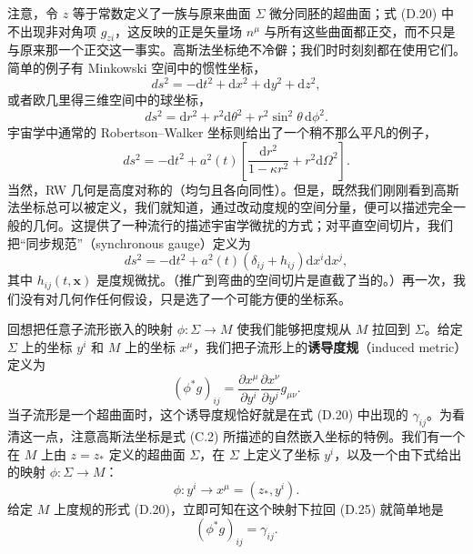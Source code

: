 注意，令 $z$ 等于常数定义了一族与原来曲面 $\Sigma$ 微分同胚的超曲面；式 (D.20) 中不出现非对角项 $g_{zi}$，这反映的正是矢量场 $n^\mu$ 与所有这些曲面都正交，而不只是与原来那一个正交这一事实。高斯法坐标绝不冷僻；我们时时刻刻都在使用它们。简单的例子有 Minkowski 空间中的惯性坐标，
\begin{equation*}
ds^2 = -\mathrm{d}t^2 + \mathrm{d}x^2 + \mathrm{d}y^2 + \mathrm{d}z^2,
\tag{D.21}
\end{equation*}
或者欧几里得三维空间中的球坐标，
\begin{equation*}
ds^2 = \mathrm{d}r^2 + r^2 \mathrm{d}\theta^2 + r^2 \sin^2 \theta \, \mathrm{d}\phi^2.
\tag{D.22}
\end{equation*}
宇宙学中通常的 Robertson--Walker 坐标则给出了一个稍不那么平凡的例子，
\begin{equation*}
ds^2 = -\mathrm{d}t^2 + a^2(t) \left[ \frac{\mathrm{d}r^2}{1 - \kappa r^2} + r^2 \mathrm{d}\Omega^2 \right].
\tag{D.23}
\end{equation*}
当然，RW 几何是高度对称的（均匀且各向同性）。但是，既然我们刚刚看到高斯法坐标总可以被定义，我们就知道，通过改动度规的空间分量，便可以描述完全一般的几何。这提供了一种流行的描述宇宙学微扰的方式；对平直空间切片，我们把“同步规范”（synchronous gauge）定义为
\begin{equation*}
ds^2 = -\mathrm{d}t^2 + a^2(t) (\delta_{ij} + h_{ij}) \mathrm{d}x^i \mathrm{d}x^j,
\tag{D.24}
\end{equation*}
其中 $h_{ij}(t, \mathbf{x})$ 是度规微扰。（推广到弯曲的空间切片是直截了当的。）再一次，我们没有对几何作任何假设，只是选了一个可能方便的坐标系。

回想把任意子流形嵌入的映射 $\phi : \Sigma \to M$ 使我们能够把度规从 $M$ 拉回到 $\Sigma$。给定 $\Sigma$ 上的坐标 $y^i$ 和 $M$ 上的坐标 $x^\mu$，我们把子流形上的\textbf{诱导度规}（induced metric）定义为
\begin{equation*}
(\phi^* g)_{ij} = \frac{\partial x^\mu}{\partial y^i} \frac{\partial x^\nu}{\partial y^j} g_{\mu\nu}.
\tag{D.25}
\end{equation*}
当子流形是一个超曲面时，这个诱导度规恰好就是在式 (D.20) 中出现的 $\gamma_{ij}$。为看清这一点，注意高斯法坐标是式 (C.2) 所描述的自然嵌入坐标的特例。我们有一个在 $M$ 上由 $z = z_*$ 定义的超曲面 $\Sigma$，在 $\Sigma$ 上定义了坐标 $y^i$，以及一个由下式给出的映射 $\phi : \Sigma \to M$：
\begin{equation*}
\phi : y^i \to x^\mu = (z_*, y^i).
\tag{D.26}
\end{equation*}
给定 $M$ 上度规的形式 (D.20)，立即可知在这个映射下拉回 (D.25) 就简单地是
\begin{equation*}
(\phi^* g)_{ij} = \gamma_{ij}.
\tag{D.27}
\end{equation*}

